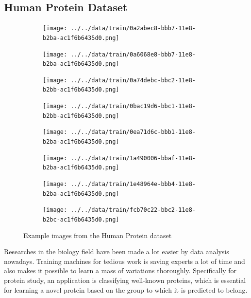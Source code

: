 \documentclass{article}
\begin{document}
\subsection{Human Protein Dataset}
\begin{figure}[h!]
    \centering
    \begin{subfigure}[b]{0.2\linewidth}
      \texttt{[image: ../../data/train/0a2abec8-bbb7-11e8-b2ba-ac1f6b6435d0.png]}
    \end{subfigure}
    \begin{subfigure}[b]{0.2\linewidth}
      \texttt{[image: ../../data/train/0a6068e8-bbb7-11e8-b2ba-ac1f6b6435d0.png]}
    \end{subfigure}
    \begin{subfigure}[b]{0.2\linewidth}
        \texttt{[image: ../../data/train/0a74debc-bbc2-11e8-b2bb-ac1f6b6435d0.png]}
    \end{subfigure}
    \begin{subfigure}[b]{0.2\linewidth}
        \texttt{[image: ../../data/train/0bac19d6-bbc1-11e8-b2bb-ac1f6b6435d0.png]}
    \end{subfigure}

    \begin{subfigure}[b]{0.2\linewidth}
        \texttt{[image: ../../data/train/0ea71d6c-bbb1-11e8-b2ba-ac1f6b6435d0.png]}
      \end{subfigure}
      \begin{subfigure}[b]{0.2\linewidth}
        \texttt{[image: ../../data/train/1a490006-bbaf-11e8-b2ba-ac1f6b6435d0.png]}
      \end{subfigure}
      \begin{subfigure}[b]{0.2\linewidth}
          \texttt{[image: ../../data/train/1e48964e-bbb4-11e8-b2ba-ac1f6b6435d0.png]}
      \end{subfigure}
      \begin{subfigure}[b]{0.2\linewidth}
          \texttt{[image: ../../data/train/fcb70c22-bbc2-11e8-b2bc-ac1f6b6435d0.png]}
      \end{subfigure}
    \caption{Example images from the Human Protein dataset}
  \end{figure}
  
Researches in the biology field have been made a lot easier by data analysis nowadays. Training machines for tedious work is saving experts a lot of time and also makes it possible to learn a mass of variations thoroughly. Specifically for protein study, an application is classifying well-known proteins, which is essential for learning a novel protein based on the group to which it is predicted to belong. 
\end{document}
